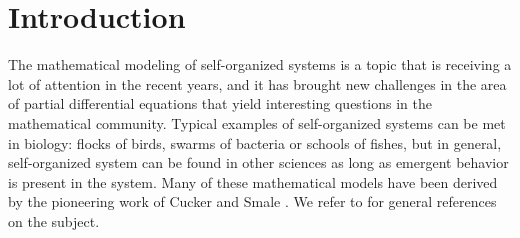 \documentclass[10pt,reqno]{amsart}
\begin{document}
\maketitle

\tableofcontents

\section{Introduction}
The mathematical modeling of self-organized systems is a topic that is receiving a lot of attention in the recent years, 
and it has brought new challenges in the area of partial differential equations that yield interesting questions in the mathematical community. 
Typical examples of self-organized systems can be met in biology: flocks of birds, swarms of bacteria or schools of fishes, but in general, 
self-organized system can be found in other sciences as long as emergent behavior is present in the system. Many of these mathematical models 
have been derived by the pioneering work of Cucker and Smale \cite{CuS1}. We refer to \cite{CFTV-2010, Shv2021} for general references on the subject.
\end{document}
